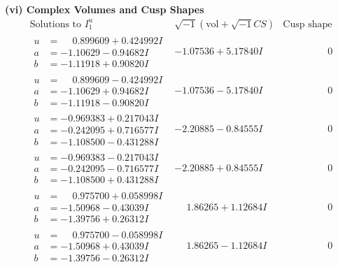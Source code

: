 \documentclass[1p]{elsarticle_modified}
\theoremstyle{definition}
\newcommand{\I}{\sqrt{-1}}
\begin{document}
\newpage\flushleft \textbf{(vi) Complex Volumes and Cusp Shapes}
$$\begin{array}{c|c|c}  
\text{Solutions to }I^u_{1}& \I (\text{vol} + \sqrt{-1}CS) & \text{Cusp shape}\\
 \hline 
\begin{aligned}
u &= \phantom{-}0.899609 + 0.424992 I \\
a &= -1.10629 - 0.94682 I \\
b &= -1.11918 + 0.90820 I\end{aligned}
 & -1.07536 + 5.17840 I & \phantom{-0.000000 } 0 \\ \hline\begin{aligned}
u &= \phantom{-}0.899609 - 0.424992 I \\
a &= -1.10629 + 0.94682 I \\
b &= -1.11918 - 0.90820 I\end{aligned}
 & -1.07536 - 5.17840 I & \phantom{-0.000000 } 0 \\ \hline\begin{aligned}
u &= -0.969383 + 0.217043 I \\
a &= -0.242095 + 0.716577 I \\
b &= -1.108500 - 0.431288 I\end{aligned}
 & -2.20885 - 0.84555 I & \phantom{-0.000000 } 0 \\ \hline\begin{aligned}
u &= -0.969383 - 0.217043 I \\
a &= -0.242095 - 0.716577 I \\
b &= -1.108500 + 0.431288 I\end{aligned}
 & -2.20885 + 0.84555 I & \phantom{-0.000000 } 0 \\ \hline\begin{aligned}
u &= \phantom{-}0.975700 + 0.058998 I \\
a &= -1.50968 - 0.43039 I \\
b &= -1.39756 + 0.26312 I\end{aligned}
 & \phantom{-}1.86265 + 1.12684 I & \phantom{-0.000000 } 0 \\ \hline\begin{aligned}
u &= \phantom{-}0.975700 - 0.058998 I \\
a &= -1.50968 + 0.43039 I \\
b &= -1.39756 - 0.26312 I\end{aligned}
 & \phantom{-}1.86265 - 1.12684 I & \phantom{-0.000000 } 0 \\ \hline\begin{aligned}

\end{aligned}
\end{array}$$
\end{document}
